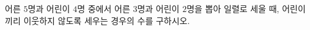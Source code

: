 \hspace*{2mm}\begin{minipage}[t]{\dimexpr\linewidth-2mm\relax}\vspace{0pt}
어른 $5$명과 어린이 $4$명 중에서 어른 $3$명과 어린이 $2$명을 뽑아 일렬로 세울 때, 어린이끼리 이웃하지 않도록 세우는 경우의 수를 구하시오.\end{minipage}
